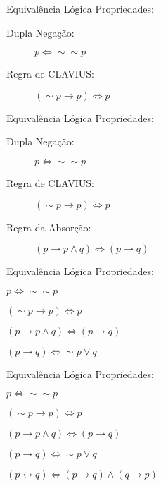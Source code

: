 \begin{frame}[t]{Equivalência Lógica} %
	Propriedades:
	\begin{description}
	\item [Dupla Negação:] $p \Leftrightarrow \sim\sim p$

	\item [Regra de CLAVIUS:] $(\sim p \rightarrow p) \Leftrightarrow p$
	\end{description}
\end{frame}
\begin{frame}[t]{Equivalência Lógica} %
	Propriedades:
	\begin{description}
	\item [Dupla Negação:] $p \Leftrightarrow \sim\sim p$

	\item [Regra de CLAVIUS:] $(\sim p \rightarrow p) \Leftrightarrow p$

	\item [Regra da Absorção:] $(p \rightarrow p \wedge q) \Leftrightarrow (p \rightarrow q)$
	\end{description}
\end{frame}
\begin{frame}[t]{Equivalência Lógica} %
	Propriedades:
	\begin{description}
	\item [Dupla Negação:] $p \Leftrightarrow \sim\sim p$

	\item [Regra de CLAVIUS:] $(\sim p \rightarrow p) \Leftrightarrow p$

	\item [Regra da Absorção:] $(p \rightarrow p \wedge q) \Leftrightarrow (p \rightarrow q)$

	\item $(p \rightarrow q) \Leftrightarrow \sim p \vee q$
	\end{description}
\end{frame}
\begin{frame}[t]{Equivalência Lógica} %
	Propriedades:
	\begin{description}
	\item [Dupla Negação:] $p \Leftrightarrow \sim\sim p$

	\item [Regra de CLAVIUS:] $(\sim p \rightarrow p) \Leftrightarrow p$

	\item [Regra da Absorção:] $(p \rightarrow p \wedge q) \Leftrightarrow (p \rightarrow q)$

	\item $(p \rightarrow q) \Leftrightarrow \sim p \vee q$

	\item $(p \leftrightarrow q) \Leftrightarrow (p \rightarrow q) \wedge (q \rightarrow p)$
	\end{description}
\end{frame}
